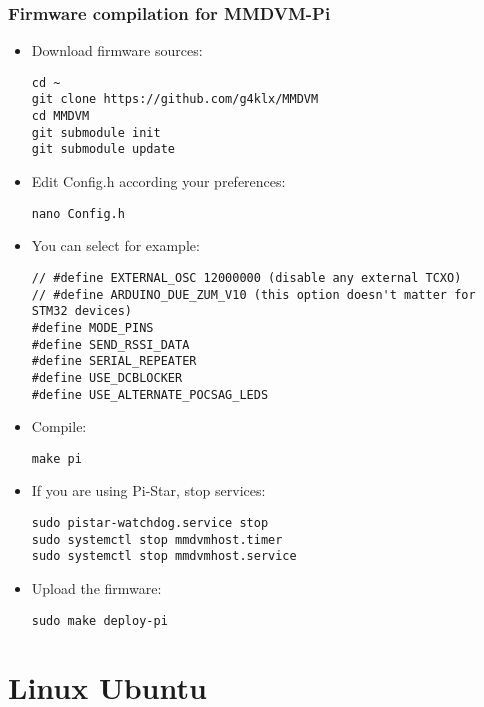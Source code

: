 \documentclass[]{article}
\begin{document}
\subsubsection{Firmware compilation for MMDVM-Pi}

\begin{itemize}[leftmargin=*]
	
\item Download firmware sources:
\begin{lstlisting}[style=DOS]
cd ~
git clone https://github.com/g4klx/MMDVM
cd MMDVM
git submodule init
git submodule update
\end{lstlisting}

\item Edit Config.h according your preferences:
\begin{lstlisting}[style=DOS]
nano Config.h
\end{lstlisting}

\item You can select for example:

\begin{verbatim}
// #define EXTERNAL_OSC 12000000 (disable any external TCXO)
// #define ARDUINO_DUE_ZUM_V10 (this option doesn't matter for STM32 devices)
#define MODE_PINS
#define SEND_RSSI_DATA
#define SERIAL_REPEATER
#define USE_DCBLOCKER
#define USE_ALTERNATE_POCSAG_LEDS
\end{verbatim}

\item Compile:
\begin{lstlisting}[style=DOS]
make pi
\end{lstlisting}

\item If you are using Pi-Star, stop services:

\begin{lstlisting}[style=DOS]
sudo pistar-watchdog.service stop
sudo systemctl stop mmdvmhost.timer
sudo systemctl stop mmdvmhost.service
\end{lstlisting}

\item Upload the firmware:
\begin{lstlisting}[style=DOS]
sudo make deploy-pi
\end{lstlisting}

\end{itemize}

\section{Linux Ubuntu}
\end{document}
